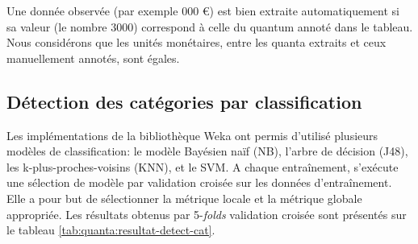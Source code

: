 Une donnée observée (par exemple  000 \euro \fg) est bien extraite automatiquement si sa valeur (le nombre $3000$) correspond à celle du quantum annoté dans le tableau. Nous considérons que les unités monétaires, entre les quanta extraits et ceux manuellement annotés, sont égales.




\subsection{Détection des catégories par classification}
Les implémentations de la bibliothèque Weka \citep{frank2016weka} ont permis d'utilisé plusieurs modèles de classification: le modèle Bayésien naïf (NB), l'arbre de décision (J48), les k-plus-proches-voisins (KNN), et le SVM.
 A chaque entraînement, s'exécute une sélection de modèle par validation croisée sur les données d'entraînement. Elle a pour but de sélectionner la métrique locale et la métrique globale appropriée. Les résultats obtenus par 5-\textit{folds} validation croisée sont présentés sur le tableau \ref{tab:quanta:resultat-detect-cat}.  
 
